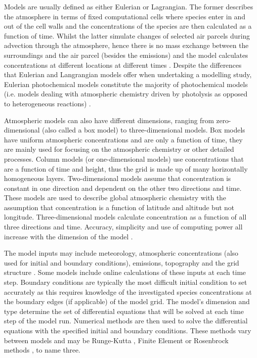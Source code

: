 Models are usually defined as either Eulerian or Lagrangian. 
The former describes the atmosphere in terms of fixed computational cells where species enter in and out of the cell walls and the concentrations of the species are then calculated as a function of time. 
Whilst the latter simulate changes of selected air parcels during advection through the atmosphere, hence there is no mass exchange between the surroundings and the air parcel (besides the emissions) and the model calculates concentrations at different locations at different times \citep{Seinfeld:2006}. 
Despite the differences that Eulerian and Langrangian models offer when undertaking a modelling study, Eulerian photochemical models constitute the majority of photochemical models (i.e. models dealing with atmospheric chemistry driven by photolysis as opposed to heterogeneous reactions) \citep{Russell:2000}.

Atmospheric models can also have different dimensions, ranging from zero-dimensional (also called a box model) to three-dimensional models. 
Box models have uniform atmospheric concentrations and are only a function of time, they are mainly used for focusing on the atmospheric chemistry or other detailed processes. 
Column models (or one-dimensional models) use concentrations that are a function of time and height, thus the grid is made up of many horizontally homogeneous layers. 
Two-dimensional models assume that concentration is constant in one direction and dependent on the other two directions and time. 
These models are used to describe global atmospheric chemistry with the assumption that concentration is a function of latitude and altitude but not longitude.  
Three-dimensional models calculate concentration as a function of all three directions and time. Accuracy, simplicity and use of computing power all increase with the dimension of the model \citep{Seinfeld:2006}.

The model inputs may include meteorology, atmospheric concentrations (also used for initial and boundary conditions), emissions, topography and the grid structure \citep{Russell:2000}. 
Some models include online calculations of these inputs at each time step. 
Boundary conditions are typically the most difficult initial condition to set accurately as this requires knowledge of the investigated species concentrations at the boundary edges (if applicable) of the model grid. 
The model's dimension and type determine the set of differential equations that will be solved at each time step of the model run. 
Numerical methods are then used to solve the differential equations with the specified initial and boundary conditions. 
These methods vary between models and may be Runge-Kutta \citep{Sandu:1997b}, Finite Element \citep{Russell:2000} or Rosenbrock methods \citep{Sandu:1997a}, to name three.

